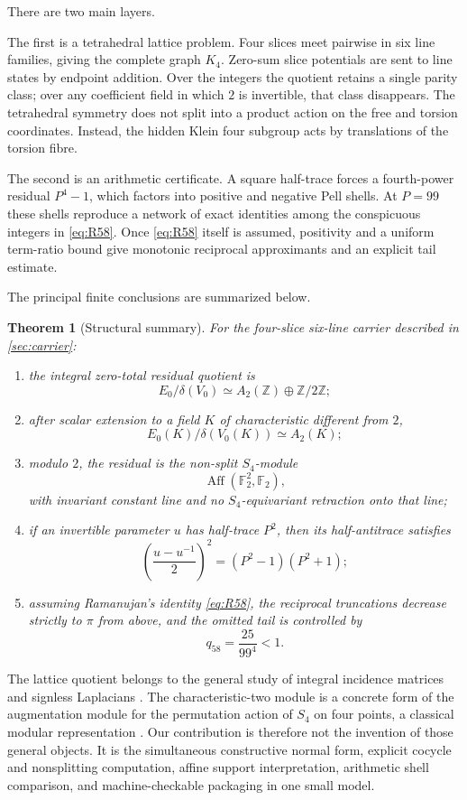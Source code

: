 \documentclass[11pt]{amsart}
\newtheorem{theorem}{Theorem}[section]
\theoremstyle{definition}
\theoremstyle{remark}
\newcommand{\Z}{\mathbb Z}
\newcommand{\F}{\mathbb F}
\newcommand{\Aff}{\operatorname{Aff}}
\begin{document}
There are two main layers.

The first is a tetrahedral lattice problem. Four slices meet pairwise in six line families, giving the complete graph $K_4$. Zero-sum slice potentials are sent to line states by endpoint addition. Over the integers the quotient retains a single parity class; over any coefficient field in which $2$ is invertible, that class disappears. The tetrahedral symmetry does not split into a product action on the free and torsion coordinates. Instead, the hidden Klein four subgroup acts by translations of the torsion fibre.

The second is an arithmetic certificate. A square half-trace forces a fourth-power residual $P^4-1$, which factors into positive and negative Pell shells. At $P=99$ these shells reproduce a network of exact identities among the conspicuous integers in \eqref{eq:R58}. Once \eqref{eq:R58} itself is assumed, positivity and a uniform term-ratio bound give monotonic reciprocal approximants and an explicit tail estimate.

The principal finite conclusions are summarized below.

\begin{theorem}[Structural summary]\label{thm:summary}
For the four-slice six-line carrier described in \cref{sec:carrier}:
\begin{enumerate}[label=\textup{(\roman*)}]
\item the integral zero-total residual quotient is
\[
 E_0/\delta(V_0)\simeq A_2(\Z)\oplus\Z/2\Z;
\]
\item after scalar extension to a field $K$ of characteristic different from $2$,
\[
 E_0(K)/\delta(V_0(K))\simeq A_2(K);
\]
\item modulo $2$, the residual is the non-split $S_4$-module
\[
 \Aff(\F_2^2,\F_2),
\]
with invariant constant line and no $S_4$-equivariant retraction onto that line;
\item if an invertible parameter $u$ has half-trace $P^2$, then its half-antitrace satisfies
\[
 \left(\frac{u-u^{-1}}2\right)^2=(P^2-1)(P^2+1);
\]
\item assuming Ramanujan's identity \eqref{eq:R58}, the reciprocal truncations decrease strictly to $\pi$ from above, and the omitted tail is controlled by
\[
 q_{58}=\frac{25}{99^4}<1.
\]
\end{enumerate}
\end{theorem}

The lattice quotient belongs to the general study of integral incidence matrices and signless Laplacians \cite{CvetkovicRowlinsonSimic2007,Newman1972}. The characteristic-two module is a concrete form of the augmentation module for the permutation action of $S_4$ on four points, a classical modular representation \cite{Benson1991,JamesKerber1981}. Our contribution is therefore not the invention of those general objects. It is the simultaneous constructive normal form, explicit cocycle and nonsplitting computation, affine support interpretation, arithmetic shell comparison, and machine-checkable packaging in one small model.
\end{document}
